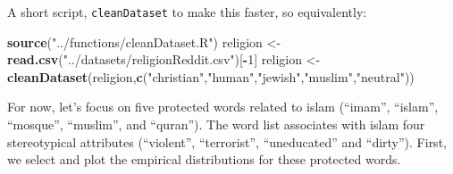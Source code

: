 \documentclass[12pt,]{book}
\newenvironment{Shaded}{\begin{snugshade}}{\end{snugshade}}
\newcommand{\KeywordTok}[1]{\textcolor[rgb]{0.13,0.29,0.53}{\textbf{#1}}}
\newcommand{\DecValTok}[1]{\textcolor[rgb]{0.00,0.00,0.81}{#1}}
\newcommand{\StringTok}[1]{\textcolor[rgb]{0.31,0.60,0.02}{#1}}
\newcommand{\OperatorTok}[1]{\textcolor[rgb]{0.81,0.36,0.00}{\textbf{#1}}}
\newcommand{\NormalTok}[1]{#1}
\begin{document}
\begin{Shaded}
\end{Shaded}

\normalsize

A short script, \texttt{cleanDataset} to make this faster, so
equivalently:

\vspace{1mm} \footnotesize

\begin{Shaded}
\begin{Highlighting}[]
\KeywordTok{source}\NormalTok{(}\StringTok{"../functions/cleanDataset.R"}\NormalTok{)}
\NormalTok{religion <-}\StringTok{ }\KeywordTok{read.csv}\NormalTok{(}\StringTok{"../datasets/religionReddit.csv"}\NormalTok{)[}\OperatorTok{-}\DecValTok{1}\NormalTok{]}
\NormalTok{religion <-}\StringTok{ }\KeywordTok{cleanDataset}\NormalTok{(religion,}\KeywordTok{c}\NormalTok{(}\StringTok{"christian"}\NormalTok{,}\StringTok{"human"}\NormalTok{,}\StringTok{"jewish"}\NormalTok{,}\StringTok{"muslim"}\NormalTok{,}\StringTok{"neutral"}\NormalTok{))}
\end{Highlighting}
\end{Shaded}

\normalsize

For now, let's focus on five protected words related to islam (``imam'',
``islam'', ``mosque'', ``muslim'', and ``quran''). The word list
associates with islam four stereotypical attributes (``violent'',
``terrorist'', ``uneducated'' and ``dirty''). First, we select and plot
the empirical distributions for these protected words.

\vspace{1mm} \footnotesize
\end{document}
